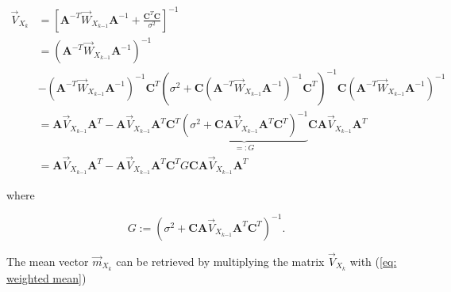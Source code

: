 \documentclass[11pt,a4paper,twoside]{report}
\newcommand{\messF}[3]{\overrightarrow{#1}_{{#2}_{k{#3}}}}
\newcommand{\mat}[1]{\mathbf{#1}}
\begin{document}
\begin{align}
	\label{eq: update rule, covariance}
	\messF{V}{X}{} &= \left[\mat{A}^{-T}\messF{W}{X}{-1}\mat{A}^{-1} + \frac{\mat{C}^T\mat{C}}{\sigma^2}\right]^{-1} \\
	\nonumber
	&= \left(\mat{A}^{-T}\messF{W}{X}{-1}\mat{A}^{-1}\right)^{-1} \\
	& - \left(\mat{A}^{-T}\messF{W}{X}{-1}\mat{A}^{-1}\right)^{-1}\mat{C}^T\left(\sigma^2 + \mat{C}\left(\mat{A}^{-T}\messF{W}{X}{-1}\mat{A}^{-1}\right)^{-1}\mat{C}^T\right)^{-1}\mat{C}\left(\mat{A}^{-T}\messF{W}{X}{-1}\mat{A}^{-1}\right)^{-1} \\
	\nonumber
	&= \mat{A}\messF{V}{X}{-1}\mat{A}^T - \mat{A}\messF{V}{X}{-1}\mat{A}^T\mat{C}^T\underbrace{\left(\sigma^2 + \mat{C}\mat{A}\messF{V}{X}{-1}\mat{A}^T\mat{C}^T\right)^{-1}}_{=:G}\mat{C}\mat{A}\messF{V}{X}{-1}\mat{A}^T \\
	&= \mat{A}\messF{V}{X}{-1}\mat{A}^T - \mat{A}\messF{V}{X}{-1}\mat{A}^T\mat{C}^TG\mat{CA}\messF{V}{X}{-1}\mat{A}^T
\end{align}

\noindent where

\begin{equation*}
	G := \left( \sigma^2 + \mat{C} \mat{A}\messF{V}{X}{-1} \mat{A}^T\mat{C}^T \right)^{-1}.
\end{equation*}

The mean vector $\messF{m}{X}{}$ can be retrieved by multiplying the matrix $\messF{V}{X}{}$ with (\ref{eq: weighted mean})
\end{document}
